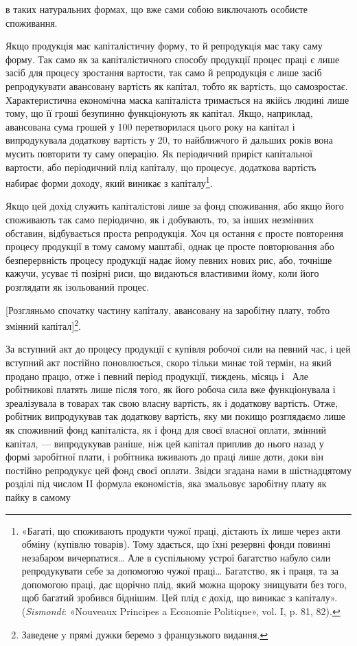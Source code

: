 \parcont{}  %
в таких натуральних формах, що вже сами собою виключають
особисте споживання.

Якщо продукція має капіталістичну форму, то й репродукція
має таку саму форму. Так само як за капіталістичного способу
продукції процес праці є лише засіб для процесу зростання
вартости, так само й репродукція є лише засіб репродукувати
авансовану вартість як капітал, тобто як вартість, що самозростає.
Характеристична економічна маска капіталіста тримається
на якійсь людині лише тому, що її гроші безупинно функціонують
як капітал. Якщо, наприклад, авансована сума грошей
у 100 перетворилася цього року на капітал
і випродукувала додаткову вартість у 20,
то найближчого й дальших років вона мусить повторити ту саму
операцію. Як періодичний приріст капітальної вартости, або
періодичний плід капіталу, що процесує, додаткова вартість набирає
форми доходу, який виникає з капіталу\footnote{
«Багаті, що споживають продукти чужої праці, дістають їх лише
через акти обміну (купівлю товарів). Тому здається, що їхні резервні
фонди повинні незабаром вичерпатися\dots{} Але в суспільному устрої багатство
набуло сили репродукувати себе за допомогою чужої праці\dots{} Багатство,
як і праця, та за допомогою праці, дає щорічно плід, який можна
щороку знищувати без того, щоб багатий зробився біднішим. Цей плід є
дохід, що виникає з капіталу». (\emph{Sismondi}: «Nouveaux Principes a Economie
Politique», vol. I, p. 81, 82).
}.

Якщо цей дохід служить капіталістові лише за фонд споживання,
або якщо його споживають так само періодично, як і
добувають, то, за інших незмінних обставин, відбувається проста
репродукція. Хоч ця остання є просте повторення процесу продукції
в тому самому маштабі, однак це просте повторювання або
безперервність процесу продукції надає йому певних нових рис,
або, точніше кажучи, усуває ті позірні риси, що видаються властивими
йому, коли його розглядати як ізольований процес.

[Розгляньмо спочатку частину капіталу, авансовану на заробітну
плату, тобто змінний капітал]\footnote*{
Заведене y прямі дужки беремо з французького видання. 
}.

За вступний акт до процесу продукції є купівля робочої сили
на певний час, і цей вступний акт постійно поновлюється, скоро
тільки минає той термін, на який продано працю, отже і певний
період продукції, тиждень, місяць і~ Але робітникові платять
лише після того, як його робоча сила вже функціонувала і зреалізувала
в товарах так свою власну вартість, як і додаткову вартість.
Отже, робітник випродукував так додаткову вартість, яку
ми покищо розглядаємо лише як споживний фонд капіталіста,
як і фонд для своєї власної оплати, змінний капітал, — випродукував
раніше, ніж цей капітал приплив до нього назад у формі
заробітної плати, і робітника вживають до праці лише доти,
доки він постійно репродукує цей фонд своєї оплати. Звідси
згадана нами в шістнадцятому розділі під числом II формула
економістів, яка змальовує заробітну плату як пайку в самому
\parbreak{}  %
